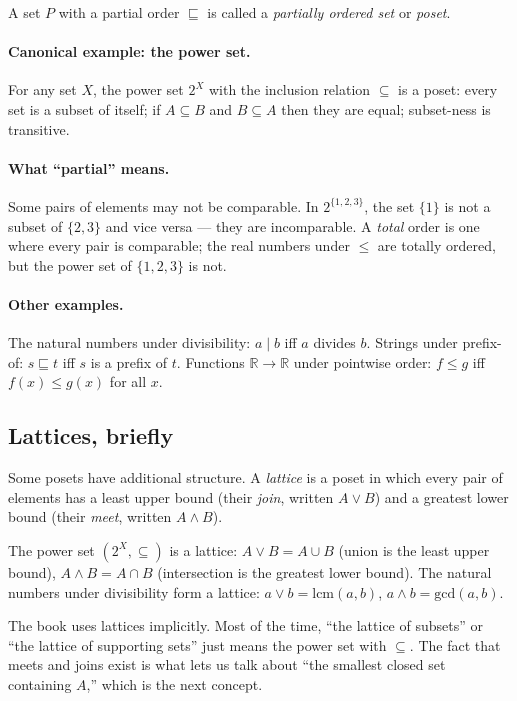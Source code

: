 A set $P$ with a partial order $\sqsubseteq$ is called a
\emph{partially ordered set} or \emph{poset}.

\paragraph{Canonical example: the power set.} For any set $X$, the
power set $2^X$ with the inclusion relation $\subseteq$ is a poset:
every set is a subset of itself; if $A \subseteq B$ and $B \subseteq
A$ then they are equal; subset-ness is transitive.

\paragraph{What ``partial'' means.} Some pairs of elements may not be
comparable. In $2^{\{1,2,3\}}$, the set $\{1\}$ is not a subset of
$\{2, 3\}$ and vice versa --- they are incomparable. A \emph{total}
order is one where every pair is comparable; the real numbers under
$\leq$ are totally ordered, but the power set of $\{1,2,3\}$ is not.

\paragraph{Other examples.} The natural numbers under divisibility:
$a \mid b$ iff $a$ divides $b$. Strings under prefix-of: $s
\sqsubseteq t$ iff $s$ is a prefix of $t$. Functions $\mathbb{R}
\to \mathbb{R}$ under pointwise order: $f \leq g$ iff $f(x) \leq
g(x)$ for all $x$.

\subsection*{Lattices, briefly}

Some posets have additional structure. A \emph{lattice} is a poset
in which every pair of elements has a least upper bound (their
\emph{join}, written $A \vee B$) and a greatest lower bound (their
\emph{meet}, written $A \wedge B$).

The power set $(2^X, \subseteq)$ is a lattice: $A \vee B = A \cup B$
(union is the least upper bound), $A \wedge B = A \cap B$
(intersection is the greatest lower bound). The natural numbers
under divisibility form a lattice: $a \vee b = \mathrm{lcm}(a, b)$,
$a \wedge b = \mathrm{gcd}(a, b)$.

The book uses lattices implicitly. Most of the time, ``the lattice
of subsets'' or ``the lattice of supporting sets'' just means the
power set with $\subseteq$. The fact that meets and joins exist is
what lets us talk about ``the smallest closed set containing $A$,''
which is the next concept.

